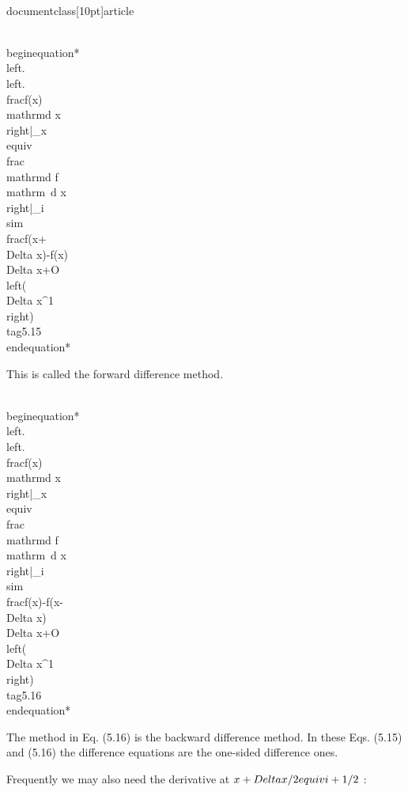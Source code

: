 \\documentclass[10pt]{article}
\begin{document}
\\begin{equation*}
\\left.\\left.\\frac{f(x)}{\\mathrm{d} x}\\right|_{x} \\equiv \\frac{\\mathrm{d} f}{\\mathrm{~d} x}\\right|_{i} \\sim \\frac{f(x+\\Delta x)-f(x)}{\\Delta x}+O\\left(\\Delta x^{1}\\right) \\tag{5.15}
\\end{equation*}


This is called the forward difference method.


\\begin{equation*}
\\left.\\left.\\frac{f(x)}{\\mathrm{d} x}\\right|_{x} \\equiv \\frac{\\mathrm{d} f}{\\mathrm{~d} x}\\right|_{i} \\sim \\frac{f(x)-f(x-\\Delta x)}{\\Delta x}+O\\left(\\Delta x^{1}\\right) \\tag{5.16}
\\end{equation*}


The method in Eq. (5.16) is the backward difference method. In these Eqs. (5.15) and (5.16) the difference equations are the one-sided difference ones.

Frequently we may also need the derivative at $x+\\Delta x / 2 \\equiv i+1 / 2$ :
\end{document}
